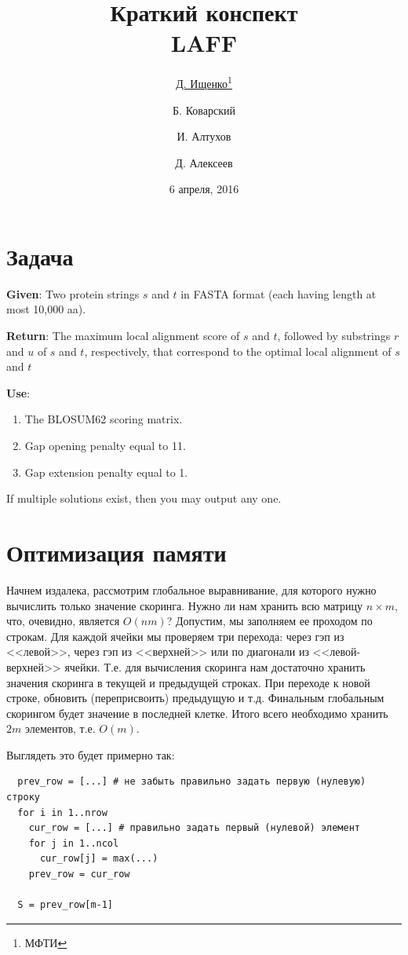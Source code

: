 \documentclass[letterpaper, 11pt]{article}
\title{\large{Краткий конспект}\\
\LARGE{LAFF}}
\date{6 апреля, 2016}
\author{\underline{Д. Ищенко\thanks{МФТИ}} \and Б. Коварский\footnotemark[1]
\and И. Алтухов\footnotemark[1] \and Д. Алексеев\footnotemark[1]}
\begin{document}
\maketitle
\thispagestyle{empty}
\clearpage

\section{Задача}

\textbf{Given}: Two protein strings $s$ and $t$ in FASTA format (each having length at most 10,000 aa).

\textbf{Return}: The maximum local alignment score of $s$ and $t$, followed by substrings $r$ and $u$ of $s$ and $t$, respectively, that correspond to the optimal local alignment of $s$ and $t$

\textbf{Use}:
\begin{enumerate}
\item
The BLOSUM62 scoring matrix.
\item
Gap opening penalty equal to 11.
\item
Gap extension penalty equal to 1.
\end{enumerate}

If multiple solutions exist, then you may output any one.

\section{Оптимизация памяти}
Начнем издалека, рассмотрим глобальное выравнивание, для которого нужно вычислить только значение скоринга. Нужно ли нам хранить всю матрицу $n \times m$, что, очевидно, является $O(nm)$? Допустим, мы заполняем ее проходом по строкам. Для каждой ячейки мы проверяем три перехода: через гэп из <<левой>>, через гэп из <<верхней>> или по диагонали из <<левой-верхней>> ячейки. Т.е. для вычисления скоринга нам достаточно хранить значения скоринга в текущей и предыдущей строках. При переходе к новой строке, обновить (переприсвоить) предыдущую и т.д. Финальным глобальным скорингом будет значение в последней клетке. Итого всего необходимо хранить $2m$ элементов, т.е. $O(m)$.

Выглядеть это будет примерно так:
\begin{verbatim}
  prev_row = [...] # не забыть правильно задать первую (нулевую) строку
  for i in 1..nrow
    cur_row = [...] # правильно задать первый (нулевой) элемент
    for j in 1..ncol
      cur_row[j] = max(...)
    prev_row = cur_row
  
  S = prev_row[m-1]
\end{verbatim}
\end{document}
